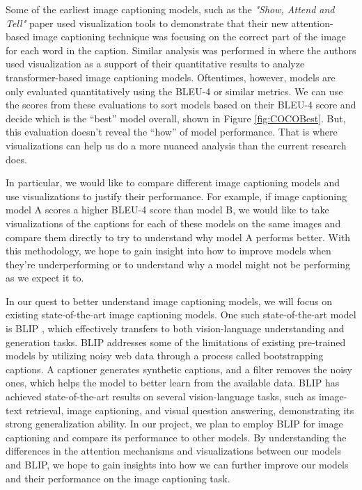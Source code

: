 \documentclass[10pt,twocolumn,letterpaper]{article}
\begin{document}
Some of the earliest image captioning models, such as the \textit{"Show, Attend and Tell"} paper \cite{xu2015show} used visualization tools to demonstrate that their new attention-based image captioning technique was focusing on the correct part of the image for each word in the caption. Similar analysis was performed in \cite{cornia2022explaining} where the authors used visualization as a support of their quantitative results to analyze transformer-based image captioning models. Oftentimes, however, models are only evaluated quantitatively using the BLEU-4 or similar metrics. We can use the scores from these evaluations to sort models based on their BLEU-4 score and decide which is the “best” model overall, shown in Figure \ref{fig:COCOBest}. But, this evaluation doesn’t reveal the “how” of model performance. That is where visualizations can help us do a more nuanced analysis than the current research does.

In particular, we would like to compare different image captioning models and use visualizations to justify their performance. For example, if image captioning model A scores a higher BLEU-4 score than model B, we would like to take visualizations of the captions for each of these models on the same images and compare them directly to try to understand why model A performs better. With this methodology, we hope to gain insight into how to improve models when they’re underperforming or to understand why a model might not be performing as we expect it to.

In our quest to better understand image captioning models, we will focus on existing state-of-the-art image captioning models. One such state-of-the-art model is BLIP \cite{blip2022}, which effectively transfers to both vision-language understanding and generation tasks. BLIP addresses some of the limitations of existing pre-trained models by utilizing noisy web data through a process called bootstrapping captions. A captioner generates synthetic captions, and a filter removes the noisy ones, which helps the model to better learn from the available data. BLIP has achieved state-of-the-art results on several vision-language tasks, such as image-text retrieval, image captioning, and visual question answering, demonstrating its strong generalization ability. In our project, we plan to employ BLIP for image captioning and compare its performance to other models. By understanding the differences in the attention mechanisms and visualizations between our models and BLIP, we hope to gain insights into how we can further improve our models and their performance on the image captioning task.
\end{document}
